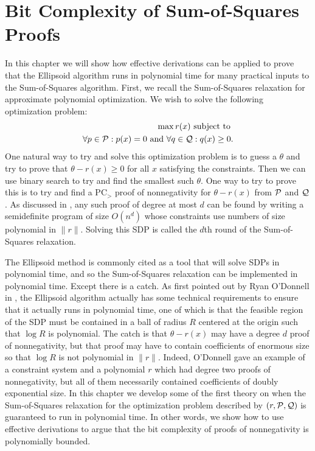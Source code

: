 \chapter{Bit Complexity of Sum-of-Squares Proofs}\label{cha:bit_complexity}
In this chapter we will show how effective derivations can be applied to prove that the Ellipsoid algorithm runs in polynomial time for many practical inputs to the Sum-of-Squares algorithm. First, we recall the Sum-of-Squares relaxation for approximate polynomial optimization. We wish to solve the following optimization problem:
\begin{align*}
\max r(x)\text{ subject to } \\
\forall p \in \mathcal P: p(x) = 0 \text{ and } \forall q \in \mathcal Q: q(x) \geq 0.
\end{align*}
One natural way to try and solve this optimization problem is to guess a $\theta$ and try to prove that $\theta - r(x) \geq 0$ for all $x$ satisfying the constraints. Then we can use binary search to try and find the smallest such $\theta$. One way to try to prove this is to try and find a PC$_>$ proof of nonnegativity for $\theta - r(x)$ from $\mathcal P$ and $\mathcal Q$. As discussed in , any such proof of degree at most $d$ can be found by writing a semidefinite program of size $O(n^d)$ whose constraints use numbers of size polynomial in $\|r\|$. Solving this SDP is called the $d$th round of the Sum-of-Squares relaxation. 

The Ellipsoid method is commonly cited as a tool that will solve SDPs in polynomial time, and so the Sum-of-Squares relaxation can be implemented in polynomial time. Except there is a catch. As first pointed out by Ryan O'Donnell in \cite{ODon16}, the Ellipsoid algorithm actually has some technical requirements to ensure that it actually runs in polynomial time, one of which is that the feasible region of the SDP must be contained in a ball of radius $R$ centered at the origin such that $\log R$ is polynomial. The catch is that $\theta - r(x)$ may have a degree $d$ proof of nonnegativity, but that proof may have to contain coefficients of enormous size so that $\log R$ is not polynomial in $\|r\|$. Indeed, O'Donnell gave an example of a constraint system and a polynomial $r$ which had degree two proofs of nonnegativity, but all of them necessarily contained coefficients of doubly exponential size. In this chapter we develop some of the first theory on when the Sum-of-Squares relaxation for the optimization problem described by $(r, \mathcal P,\mathcal Q)$ is guaranteed to run in polynomial time. In other words, we show how to use effective derivations to argue that the bit complexity of proofs of nonnegativity is polynomially bounded. 

